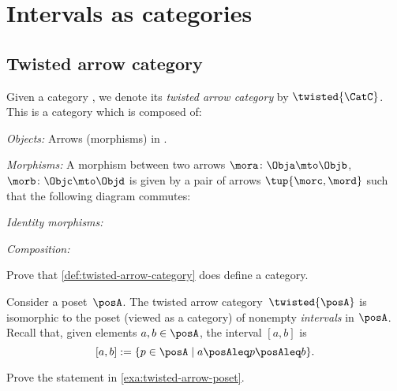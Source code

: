 \section{Intervals as categories}

\subsection{Twisted arrow category}



\begin{ctdefinition}\label{def:twisted-arrow-category}
  \label{def:twisted-arrow}
  Given a category \CatC, we denote its \emph{twisted arrow category} by $\twisted{\CatC}$. This is a category which is composed of:
  \begin{compactenum}
    \item \emph{Objects:} Arrows (morphisms) in \CatC.
    \item \emph{Morphisms:} A morphism between two arrows $\mora\colon \Obja \mto \Objb $, $\morb\colon \Objc \mto \Objd$ is given by a pair of arrows $\tup{\morc,\mord}$ such that the following diagram commutes:
    \begin{center}
    \end{center}
    \item \emph{Identity morphisms:}
    \item \emph{Composition:}
  \end{compactenum}
\end{ctdefinition}

\begin{gradedexercise}
Prove that \cref{def:twisted-arrow-category} does define a category. 
\end{gradedexercise}


\begin{example}[Intervals]\label{exa:twisted-arrow-poset}
  Consider a poset~$\posA$. The twisted arrow category~$\twisted{\posA}$ is isomorphic to the poset (viewed as a category) of nonempty \emph{intervals} in $\posA$. Recall that, given elements $a, b \in \posA$, the interval $[a,b]$ is
  $$[a,b]:=\{p \in \posA \mid a\posAleq p \posAleq b\}.$$ 
\end{example}

\begin{exercise}
Prove the statement in \cref{exa:twisted-arrow-poset}. 
\end{exercise}

